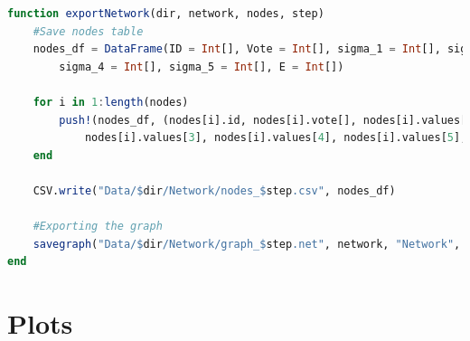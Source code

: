 \documentclass[12pt,openright,twoside]{book}
\begin{document}
\begin{appendices}
\begin{lstlisting}[language=julia]
function exportNetwork(dir, network, nodes, step)
    #Save nodes table
    nodes_df = DataFrame(ID = Int[], Vote = Int[], sigma_1 = Int[], sigma_2 = Int[], sigma_3 = Int[], 
        sigma_4 = Int[], sigma_5 = Int[], E = Int[])
    
    for i in 1:length(nodes)
        push!(nodes_df, (nodes[i].id, nodes[i].vote[], nodes[i].values[1], nodes[i].values[2], 
            nodes[i].values[3], nodes[i].values[4], nodes[i].values[5], nodes[i].energy[]))
    end

    CSV.write("Data/$dir/Network/nodes_$step.csv", nodes_df)

    #Exporting the graph
    savegraph("Data/$dir/Network/graph_$step.net", network, "Network", GraphIO.NET.NETFormat())
end

\end{lstlisting}

\vspace{14pt}

\chapter{Plots}


\end{appendices}
\end{document}
